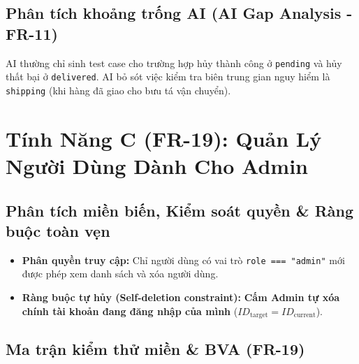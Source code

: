 \documentclass[11pt,a4paper]{article}
\begin{document}
\subsection{Phân tích khoảng trống AI (AI Gap Analysis - FR-11)}
AI thường chỉ sinh test case cho trường hợp hủy thành công ở \texttt{pending} và hủy thất bại ở \texttt{delivered}. AI bỏ sót việc kiểm tra biên trung gian nguy hiểm là \texttt{shipping} (khi hàng đã giao cho bưu tá vận chuyển).

\newpage

\section{Tính Năng C (FR-19): Quản Lý Người Dùng Dành Cho Admin}

\subsection{Phân tích miền biến, Kiểm soát quyền \& Ràng buộc toàn vẹn}
\begin{itemize}
    \item \textbf{Phân quyền truy cập:} Chỉ người dùng có vai trò \texttt{role === "admin"} mới được phép xem danh sách và xóa người dùng.
    \item \textbf{Ràng buộc tự hủy (Self-deletion constraint):} \textbf{Cấm Admin tự xóa chính tài khoản đang đăng nhập của mình} ($ID_{\text{target}} = ID_{\text{current}}$).
\end{itemize}

\subsection{Ma trận kiểm thử miền \& BVA (FR-19)}
\end{document}
